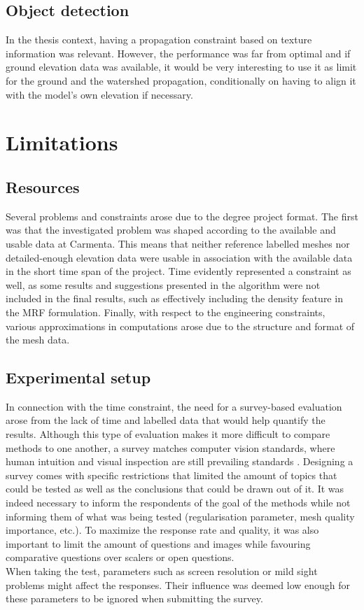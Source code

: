 \documentclass{kththesis}
\begin{document}
\subsection{Object detection}
In the thesis context, having a propagation constraint based on texture information was relevant. However, the performance was far from optimal and if ground elevation data was available, it would be very interesting to use it as limit for the ground and the watershed propagation, conditionally on having to align it with the model's own elevation if necessary. 
\section{Limitations}
\subsection{Resources}
Several problems and constraints arose due to the degree project format. The first was that the investigated problem was shaped according to the available and usable data at Carmenta. This means that neither reference labelled meshes nor detailed-enough elevation data were usable in association with the available data in the short time span of the project. Time evidently represented a constraint as well, as some results and suggestions presented in the algorithm were not included in the final results, such as effectively including the density feature in the MRF formulation. Finally, with respect to the engineering constraints, various approximations in computations arose due to the structure and format of the mesh data. 
\subsection{Experimental setup}
In connection with the time constraint, the need for a survey-based evaluation arose from the lack of time and labelled data that would help quantify the results. Although this type of evaluation makes it more difficult to compare methods to one another, a survey matches computer vision standards, where human intuition and visual inspection are still prevailing standards \parencite{ClusteringTechniques}. Designing a survey comes with specific restrictions that limited the amount of topics that could be tested as well as the conclusions that could be drawn out of it. It was indeed necessary to inform the respondents of the goal of the methods while not informing them of what was being tested (regularisation parameter, mesh quality importance, etc.). To maximize the response rate and quality, it was also important to limit the amount of questions and images while favouring comparative questions over scalers or open questions. \\
When taking the test, parameters such as screen resolution or mild sight problems might affect the responses. Their influence was deemed low enough for these parameters to be ignored when submitting the survey.
\end{document}

